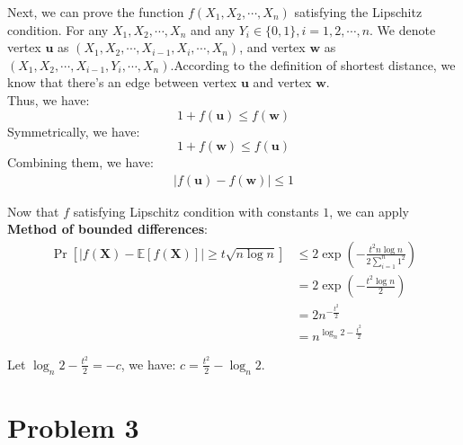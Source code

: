 \documentclass[a4paper, 12pt, titlepage]{article}
\begin{document}
Next, we can prove the function $f(X_{1}, X_{2}, \cdots, X_{n})$ satisfying the Lipschitz condition. For any $X_{1}, X_{2}, \cdots, X_{n}$ and any $Y_{i} \in \{ 0, 1 \}, i = 1, 2, \cdots, n$.
We denote vertex $\mathbf{u}$ as $(X_{1}, X_{2}, \cdots, X_{i - 1}, X_{i}, \cdots, X_{n})$, and vertex $\mathbf{w}$ as \\$(X_{1}, X_{2}, \cdots, X_{i - 1}, Y_{i}, \cdots, X_{n})$.According to
the definition of shortest distance, we know that there's an edge between vertex $\mathbf{u}$ and vertex $\mathbf{w}$.\\ Thus, we have:
\[
    1 + f(\mathbf{u}) \leq f(\mathbf{w}) 
\]
Symmetrically, we have:
\[
    1 + f(\mathbf{w}) \leq f(\mathbf{u})  
\]
Combining them, we have:
\begin{equation}
    \begin{aligned}
        | f(\mathbf{u}) - f(\mathbf{w}) | \leq 1
    \end{aligned}
\end{equation}

Now that $f$ satisfying Lipschitz condition with constants $1$, we can apply \textbf{Method of bounded differences}:
\begin{equation}
    \begin{aligned}
        \Pr \left[| f(\mathbf{X}) - \mathbb E \left[ f(\mathbf{X}) \right] | \geq t \sqrt{n \log{n}} \right] &\leq 2 \exp \left( - \frac{t^2 n \log{n}}{2 \sum_{i = 1}^{n} 1^2}\right) \\
                                                                                                             &= 2 \exp \left( - \frac{t^2 \log{n}}{2} \right) \\
                                                                                                             &= 2 n^{- \frac{t^2}{2} } \\
                                                                                                             &= n^{ \log_{n}{2} - \frac{t^2}{2}}           
    \end{aligned}
\end{equation}

Let $ \log_{n}{2} - \frac{t^2}{2} = -c$, we have: $c = \frac{t^2}{2} - \log_{n}{2}$.

\section{Problem 3}
\end{document}
